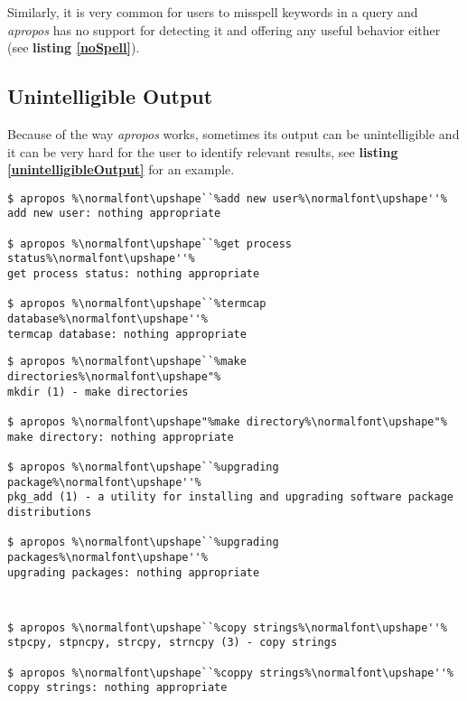 \documentclass[letterpaper,twocolumn,10pt]{article}
\begin{document}
Similarly, it is very common for users to misspell keywords in a query and \textit{apropos} has no support for detecting it and offering any useful behavior either (see {\bf listing \ref{noSpell}}).

\subsection{Unintelligible Output}
Because of the way \textit{apropos} works, sometimes its output can be
unintelligible and it can be very hard for the user to identify relevant results, see {\bf listing \ref{unintelligibleOutput}} for an example. \\

{\small
{}
\begin{lstlisting}[float=*]
$ apropos %\normalfont\upshape``%add new user%\normalfont\upshape''%
add new user: nothing appropriate

$ apropos %\normalfont\upshape``%get process status%\normalfont\upshape''%
get process status: nothing appropriate

$ apropos %\normalfont\upshape``%termcap database%\normalfont\upshape''%
termcap database: nothing appropriate
\end{lstlisting}
}


{\small
{}
\begin{lstlisting}[float=*]
$ apropos %\normalfont\upshape``%make directories%\normalfont\upshape"%
mkdir (1) - make directories

$ apropos %\normalfont\upshape"%make directory%\normalfont\upshape"%
make directory: nothing appropriate

$ apropos %\normalfont\upshape``%upgrading package%\normalfont\upshape''%
pkg_add (1) - a utility for installing and upgrading software package distributions

$ apropos %\normalfont\upshape``%upgrading packages%\normalfont\upshape''%
upgrading packages: nothing appropriate
\end{lstlisting}
}


{\tt \small
{}
\begin{lstlisting}[float=*]
$ apropos %\normalfont\upshape``%copy strings%\normalfont\upshape''%
stpcpy, stpncpy, strcpy, strncpy (3) - copy strings

$ apropos %\normalfont\upshape``%coppy strings%\normalfont\upshape''%
coppy strings: nothing appropriate
\end{lstlisting}
}
\end{document}
